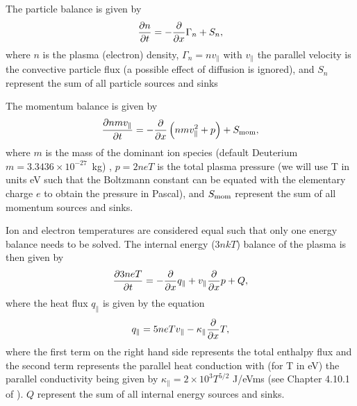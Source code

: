 \documentclass[amsmath,amssymb,a4]{revtex4-2}
\begin{document}
\noindent The particle balance is given by
\begin{equation}\label{particle_balance}
    {\partial n \over \partial t} = - {\partial \over \partial x} \Gamma_n + S_n,
\end{equation}
where $n$ is the plasma (electron) density, $\Gamma_n = n v_\parallel$ with $v_\parallel$ the parallel velocity is the convective particle flux (a possible effect of diffusion is ignored), and $S_n$ represent the sum of all particle sources and sinks

\noindent The momentum balance is given by
\begin{equation}\label{momentum_balance}
    {\partial n m v_\parallel \over \partial t} = - {\partial \over \partial x} \left( n m v_\parallel^2 + p \right) + S_{\rm mom},
\end{equation}
where $m$ is the mass of the dominant ion species (default Deuterium $m = 3.3436 \times 10^{-27}$~kg) , $p = 2 n e T$ is the total plasma pressure (we will use T in units eV such that the Boltzmann constant can be equated with the elementary charge $e$ to obtain the pressure in Pascal), and $S_{\rm mom}$ represent the sum of all momentum sources and sinks.

\noindent Ion and electron temperatures are considered equal such that only one energy balance needs to be solved. The internal energy ($3 n k T$) balance of the plasma is then given by
\begin{equation}\label{energy_balance}
    {\partial 3 n e T \over \partial t} = - {\partial \over \partial x} q_\parallel + v_\parallel {\partial \over \partial x} p + Q,
\end{equation}
where the heat flux $q_\parallel$ is given by the equation
\begin{equation}\label{heat_flux}
    q_\parallel = 5 n e T v_\parallel - \kappa_\parallel {\partial \over \partial x} T,
\end{equation}
where the first term on the right hand side represents the total enthalpy flux and the second term represents the parallel heat conduction with (for T in eV) the parallel conductivity being given by $\kappa_\parallel = 2 \times 10^3 T^{5/2}$ J/eVms (see Chapter 4.10.1 of \cite{stangeby}). $Q$ represent the sum of all internal energy sources and sinks.
\end{document}
